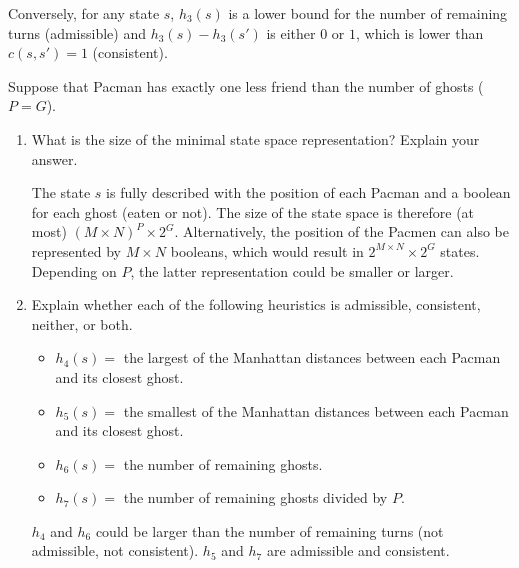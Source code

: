 \documentclass[11pt, a4paper]{article}
\begin{document}
\begin{enumerate}
\begin{solution}
\begin{center}
        \end{center}

        Conversely, for any state $s$, $h_3(s)$ is a lower bound for the number of remaining turns (admissible) and $h_3(s) - h_3(s')$ is either $0$ or $1$, which is lower than $c(s, s') = 1$ (consistent).
    \end{solution}
\end{enumerate}

Suppose that Pacman has exactly one less friend than the number of ghosts ($P=G$).

\begin{enumerate}[resume]
    \item What is the size of the minimal state space representation? Explain your answer.

    \begin{solution}
        The state $s$ is fully described with the position of each Pacman and a boolean for each ghost (eaten or not). The size of the state space is therefore (at most) $(M \times N)^P \times 2^G$. Alternatively, the position of the Pacmen can also be represented by $M \times N$ booleans, which would result in $2^{M \times N} \times 2^G$ states. Depending on $P$, the latter representation could be smaller or larger.
    \end{solution}

    \item Explain whether each of the following heuristics is admissible, consistent, neither, or both.
    \begin{itemize}[leftmargin=*]
        \item $h_4(s) =$ the largest of the Manhattan distances between each Pacman and its closest ghost.
        \item $h_5(s) =$ the smallest of the Manhattan distances between each Pacman and its closest ghost.
        \item $h_6(s) =$ the number of remaining ghosts.
        \item $h_7(s) =$ the number of remaining ghosts divided by $P$.
     \end{itemize}

     \begin{solution}
        $h_4$ and $h_6$ could be larger than the number of remaining turns (not admissible, not consistent). $h_5$ and $h_7$ are admissible and consistent.
    \end{solution}
\end{enumerate}
\end{document}
